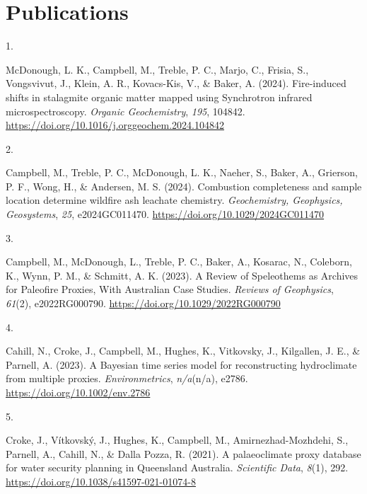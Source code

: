 \documentclass[11pt,a4paper,]{moderncv}
\newlength{\csllabelwidth}
\newcommand{\CSLLeftMargin}[1]{\parbox[t]{\csllabelwidth}{#1}}
\newcommand{\CSLRightInline}[1]{\parbox[t]{\linewidth - \csllabelwidth}{#1}}
\begin{document}
\hypertarget{publications}{%
\section{Publications}\label{publications}}

\hypertarget{bibliography}{}
\leavevmode{}%
\CSLLeftMargin{1. }%
\CSLRightInline{McDonough, L. K., Campbell, M., Treble, P. C., Marjo,
C., Frisia, S., Vongsvivut, J., Klein, A. R., Kovacs-Kis, V., \& Baker,
A. (2024). Fire-induced shifts in stalagmite organic matter mapped using
Synchrotron infrared microspectroscopy. \emph{Organic Geochemistry},
\emph{195}, 104842.
\url{https://doi.org/10.1016/j.orggeochem.2024.104842}}

\leavevmode{}%
\CSLLeftMargin{2. }%
\CSLRightInline{Campbell, M., Treble, P. C., McDonough, L. K., Naeher,
S., Baker, A., Grierson, P. F., Wong, H., \& Andersen, M. S. (2024).
Combustion completeness and sample location determine wildfire ash
leachate chemistry. \emph{Geochemistry, Geophysics, Geosystems},
\emph{25}, e2024GC011470. \url{https://doi.org/10.1029/2024GC011470}}

\leavevmode{}%
\CSLLeftMargin{3. }%
\CSLRightInline{Campbell, M., McDonough, L., Treble, P. C., Baker, A.,
Kosarac, N., Coleborn, K., Wynn, P. M., \& Schmitt, A. K. (2023). A
Review of Speleothems as Archives for Paleofire Proxies, With Australian
Case Studies. \emph{Reviews of Geophysics}, \emph{61}(2), e2022RG000790.
\url{https://doi.org/10.1029/2022RG000790}}

\leavevmode{}%
\CSLLeftMargin{4. }%
\CSLRightInline{Cahill, N., Croke, J., Campbell, M., Hughes, K.,
Vitkovsky, J., Kilgallen, J. E., \& Parnell, A. (2023). A Bayesian time
series model for reconstructing hydroclimate from multiple proxies.
\emph{Environmetrics}, \emph{n/a}(n/a), e2786.
\url{https://doi.org/10.1002/env.2786}}

\leavevmode{}%
\CSLLeftMargin{5. }%
\CSLRightInline{Croke, J., Vítkovský, J., Hughes, K., Campbell, M.,
Amirnezhad-Mozhdehi, S., Parnell, A., Cahill, N., \& Dalla Pozza, R.
(2021). A palaeoclimate proxy database for water security planning in
Queensland Australia. \emph{Scientific Data}, \emph{8}(1), 292.
\url{https://doi.org/10.1038/s41597-021-01074-8}}
\end{document}
